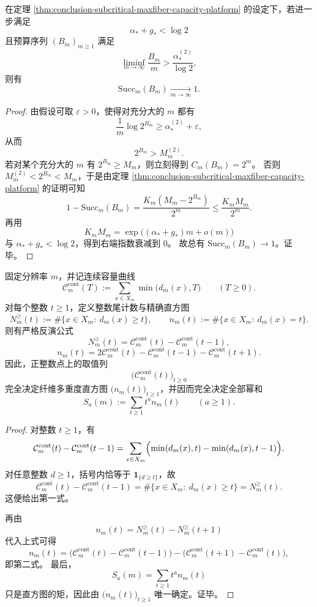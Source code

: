 \begin{corollary}[次大纤维阈值以上的渐近满恢复]\label{cor:conclusion-near-complete-recovery-above-second-maximum}
在定理 \ref{thm:conclusion-subcritical-maxfiber-capacity-platform} 的设定下，若进一步满足
\[
\alpha_\ast+g_\ast<\log 2
\]
且预算序列 \((B_m)_{m\ge 1}\) 满足
\[
\liminf_{m\to\infty}\frac{B_m}{m}>
\frac{\alpha_\ast^{(2)}}{\log 2},
\]
则有
\[
\mathrm{Succ}_m(B_m)\xrightarrow[m\to\infty]{}1.
\]
\end{corollary}
\begin{proof}
由假设可取 \(\varepsilon>0\)，使得对充分大的 \(m\) 都有
\[
\frac{1}{m}\log 2^{B_m}\ge \alpha_\ast^{(2)}+\varepsilon,
\]
从而
\[
2^{B_m}>M_m^{(2)}.
\]
若对某个充分大的 \(m\) 有 \(2^{B_m}\ge M_m\)，则立刻得到 \(C_m(B_m)=2^m\)。
否则 \(M_m^{(2)}<2^{B_m}<M_m\)，于是由定理 \ref{thm:conclusion-subcritical-maxfiber-capacity-platform} 的证明可知
\[
1-\mathrm{Succ}_m(B_m)
=
\frac{K_m(M_m-2^{B_m})}{2^m}
\le
\frac{K_mM_m}{2^m}.
\]
再用
\[
K_mM_m=\exp\!\bigl((\alpha_\ast+g_\ast)m+o(m)\bigr)
\]
与 \(\alpha_\ast+g_\ast<\log 2\)，得到右端指数衰减到 \(0\)。
故总有 \(\mathrm{Succ}_m(B_m)\to 1\)。证毕。
\end{proof}

\begin{theorem}[连续容量曲线在整数节点上的精确反演]\label{thm:conclusion-continuous-capacity-integral-node-inversion}
固定分辨率 \(m\)，并记连续容量曲线
\[
\mathcal C_m^{\mathrm{cont}}(T):=\sum_{x\in X_m}\min\bigl(d_m(x),T\bigr)
\qquad(T\ge 0).
\]
对每个整数 \(t\ge 1\)，定义整数尾计数与精确直方图
\[
N_m^{\ge}(t):=\#\{x\in X_m:\ d_m(x)\ge t\},
\qquad
n_m(t):=\#\{x\in X_m:\ d_m(x)=t\}.
\]
则有严格反演公式
\[
N_m^{\ge}(t)=\mathcal C_m^{\mathrm{cont}}(t)-\mathcal C_m^{\mathrm{cont}}(t-1),
\]
\[
n_m(t)=2\mathcal C_m^{\mathrm{cont}}(t)-\mathcal C_m^{\mathrm{cont}}(t-1)-\mathcal C_m^{\mathrm{cont}}(t+1).
\]
因此，正整数点上的取值列
\[
\bigl(\mathcal C_m^{\mathrm{cont}}(t)\bigr)_{t\ge 0}
\]
完全决定纤维多重度直方图 \(\bigl(n_m(t)\bigr)_{t\ge 1}\)，并因而完全决定全部幂和
\[
S_a(m):=\sum_{t\ge 1}t^a n_m(t)
\qquad(a\ge 1).
\]
\end{theorem}
\begin{proof}
对整数 \(t\ge 1\)，有
\[
\mathcal C_m^{\mathrm{cont}}(t)-\mathcal C_m^{\mathrm{cont}}(t-1)
=
\sum_{x\in X_m}\Bigl(\min(d_m(x),t)-\min(d_m(x),t-1)\Bigr).
\]
对任意整数 \(d\ge 1\)，括号内恰等于 \(\mathbf 1_{\{d\ge t\}}\)，故
\[
\mathcal C_m^{\mathrm{cont}}(t)-\mathcal C_m^{\mathrm{cont}}(t-1)
=
\#\{x\in X_m:\ d_m(x)\ge t\}
=
N_m^{\ge}(t).
\]
这便给出第一式。

再由
\[
n_m(t)=N_m^{\ge}(t)-N_m^{\ge}(t+1)
\]
代入上式可得
\[
n_m(t)
=
\bigl(\mathcal C_m^{\mathrm{cont}}(t)-\mathcal C_m^{\mathrm{cont}}(t-1)\bigr)
-\bigl(\mathcal C_m^{\mathrm{cont}}(t+1)-\mathcal C_m^{\mathrm{cont}}(t)\bigr),
\]
即第二式。
最后，
\[
S_a(m)=\sum_{t\ge 1}t^a n_m(t)
\]
只是直方图的矩，因此由 \(\bigl(n_m(t)\bigr)_{t\ge 1}\) 唯一确定。证毕。
\end{proof}


